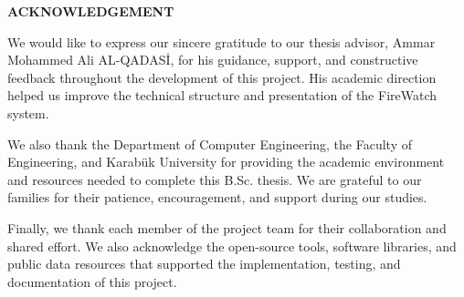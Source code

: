 \clearpage
\thispagestyle{plain}
{}

\begin{center}
{\bfseries\Large ACKNOWLEDGEMENT}
\end{center}

\vspace{1cm}

\noindent
We would like to express our sincere gratitude to our thesis advisor,
Ammar Mohammed Ali AL-QADAS\.{I}, for his guidance, support, and constructive
feedback throughout the development of this project. His academic direction
helped us improve the technical structure and presentation of the FireWatch
system.

\noindent
We also thank the Department of Computer Engineering, the Faculty of
Engineering, and Karabük University for providing the academic environment and
resources needed to complete this B.Sc. thesis. We are grateful to our families
for their patience, encouragement, and support during our studies.

\noindent
Finally, we thank each member of the project team for their collaboration and
shared effort. We also acknowledge the open-source tools, software libraries,
and public data resources that supported the implementation, testing, and
documentation of this project.

\clearpage
